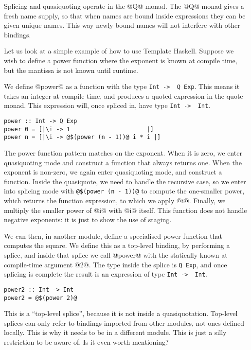 Splicing and quasiquoting operate in the @Q@ monad.
The @Q@ monad gives a fresh name supply, so that when names are bound inside expressions they can be given unique names.
This way newly bound names will not interfere with other bindings.

Let us look at a simple example of how to use Template Haskell.
Suppose we wish to define a power function where the exponent is known at compile time, but the mantissa is not known until runtime.

We define @power@ as a function with the type \lstinline/Int ->  Q Exp/.
This means it takes an integer at compile-time, and produces a quoted expression in the quote monad.
This expression will, once spliced in, have type \lstinline/Int ->  Int/.

\begin{lstlisting}
power :: Int -> Q Exp
power 0 = [|\i -> 1                      |]
power n = [|\i -> @$(power (n - 1))@ i * i |]
\end{lstlisting}

The power function pattern matches on the exponent.
When it is zero, we enter quasiquoting mode and construct a function that always returns one.
When the exponent is non-zero, we again enter quasiquoting mode, and construct a function.
Inside the quasiquote, we need to handle the recursive case, so we enter into splicing mode with \lstinline/@$(power (n - 1))@/ to compute the one-smaller power, which returns the function expression, to which we apply @i@. Finally, we multiply the smaller power of @i@ with @i@ itself.
This function does not handle negative exponents: it is just to show the use of staging.

We can then, in another module, define a specialised power function that computes the square.
We define this as a top-level binding, by performing a splice, and inside that splice we call @power@ with the statically known at compile-time argument @2@.
The type inside the splice is \lstinline/Q Exp/, and once splicing is complete the result is an expression of type \lstinline/Int ->  Int/.

\begin{lstlisting}
power2 :: Int -> Int
power2 = @$(power 2)@
\end{lstlisting}

This is a ``top-level splice'', because it is not inside a quasiquotation.
Top-level splices can only refer to bindings imported from other modules, not ones defined locally.
This is why it needs to be in a different module.
This is just a silly restriction to be aware of. Is it even worth mentioning?

